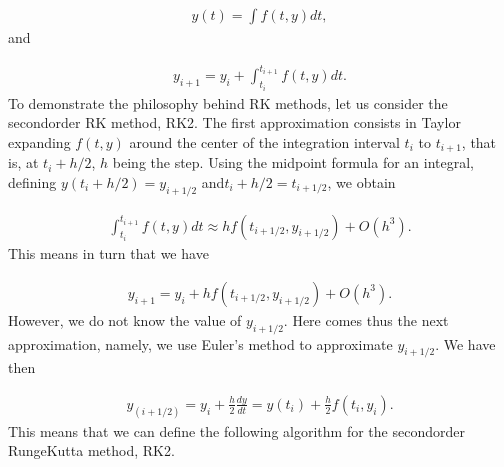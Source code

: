 \documentclass[letterpaper,10pt,english]{sphinxmanual}
\begin{document}
\begin{equation*}
\begin{split}
\begin{equation}
y(t)=\int f(t,y) dt,  
\label{_auto17} \tag{26}
\end{equation}
\end{split}
\end{equation*}
and




\begin{equation*}
\begin{split}
\begin{equation}
y_{i+1}=y_i+ \int_{t_i}^{t_{i+1}} f(t,y) dt.
\label{_auto18} \tag{27}
\end{equation}
\end{split}
\end{equation*}
To demonstrate the philosophy behind RK methods, let us consider
the second\sphinxhyphen{}order RK method, RK2.
The first approximation consists in Taylor expanding \(f(t,y)\)
around the center of the integration interval \(t_i\) to \(t_{i+1}\),
that is, at \(t_i+h/2\), \(h\) being the step.
Using the midpoint formula for an integral,
defining \(y(t_i+h/2) = y_{i+1/2}\) and\(t_i+h/2 = t_{i+1/2}\), we obtain




\begin{equation*}
\begin{split}
\begin{equation}
\int_{t_i}^{t_{i+1}} f(t,y) dt \approx hf(t_{i+1/2},y_{i+1/2}) +O(h^3).
\label{_auto19} \tag{28}
\end{equation}
\end{split}
\end{equation*}
This means in turn that we have




\begin{equation*}
\begin{split}
\begin{equation}
y_{i+1}=y_i + hf(t_{i+1/2},y_{i+1/2}) +O(h^3).
\label{_auto20} \tag{29}
\end{equation}
\end{split}
\end{equation*}
However, we do not know the value of   \(y_{i+1/2}\). Here comes thus the next approximation, namely, we use Euler’s
method to approximate \(y_{i+1/2}\). We have then




\begin{equation*}
\begin{split}
\begin{equation}
y_{(i+1/2)}=y_i + \frac{h}{2}\frac{dy}{dt}=y(t_i) + \frac{h}{2}f(t_i,y_i).
\label{_auto21} \tag{30}
\end{equation}
\end{split}
\end{equation*}
This means that we can define the following algorithm for
the second\sphinxhyphen{}order Runge\sphinxhyphen{}Kutta method, RK2.
\end{document}
